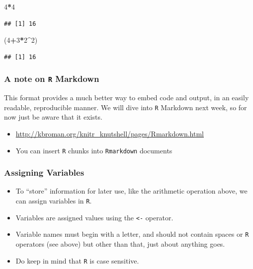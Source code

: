 \documentclass[]{book}
\newenvironment{Shaded}{\begin{snugshade}}{\end{snugshade}}
\newcommand{\DecValTok}[1]{\textcolor[rgb]{0.00,0.00,0.81}{#1}}
\newcommand{\NormalTok}[1]{#1}
\newcommand{\OperatorTok}[1]{\textcolor[rgb]{0.81,0.36,0.00}{\textbf{#1}}}
\begin{document}
\begin{Shaded}
\begin{Highlighting}[]
\DecValTok{4}\OperatorTok{*}\DecValTok{4}
\end{Highlighting}
\end{Shaded}

\begin{verbatim}
## [1] 16
\end{verbatim}

\begin{Shaded}
\begin{Highlighting}[]
\NormalTok{(}\DecValTok{4}\OperatorTok{+}\DecValTok{3}\OperatorTok{*}\DecValTok{2}\OperatorTok{^}\DecValTok{2}\NormalTok{)}
\end{Highlighting}
\end{Shaded}

\begin{verbatim}
## [1] 16
\end{verbatim}

\hypertarget{a-note-on-r-markdown}{%
\subsubsection{\texorpdfstring{A note on \texttt{R} Markdown}{A note on R Markdown}}\label{a-note-on-r-markdown}}

This format provides a much better way to embed code and output, in an easily readable, reproducible manner. We will dive into \texttt{R} Markdown next week, so for now just be aware that it exists.

\begin{itemize}
\item
  \url{http://kbroman.org/knitr_knutshell/pages/Rmarkdown.html}
\item
  You can insert \texttt{R} chunks into \texttt{Rmarkdown} documents
\end{itemize}

\hypertarget{assigning-variables}{%
\subsubsection{Assigning Variables}\label{assigning-variables}}

\begin{itemize}
\item
  To ``store'' information for later use, like the arithmetic operation above, we can assign variables in \texttt{R}.
\item
  Variables are assigned values using the \texttt{\textless{}-} operator.
\item
  Variable names must begin with a letter, and should not contain spaces or \texttt{R} operators (see above) but other than that, just about anything goes.
\item
  Do keep in mind that \texttt{R} is case sensitive.
\end{itemize}
\end{document}
